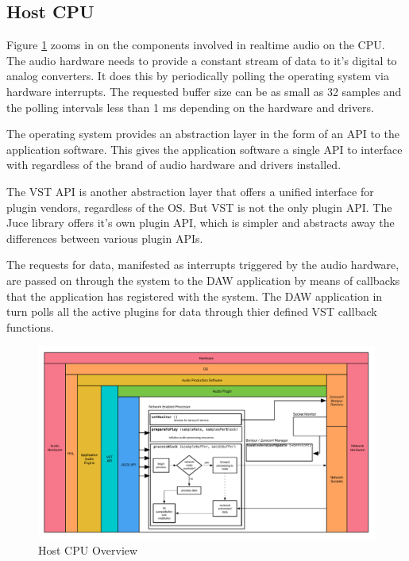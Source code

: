 \subsection{Host CPU}

Figure \ref{fig:arch_02} zooms in on the components involved in realtime audio on the CPU. The audio hardware needs to provide a constant stream of data to it's digital to analog converters. It does this by periodically polling the operating system via hardware interrupts. The requested buffer size can be as small as 32 samples and the polling intervals less than 1 ms depending on the hardware and drivers.

The operating system provides an abstraction layer in the form of an API to the application software. This gives the application software a single API to interface with regardless of the brand of audio hardware and drivers installed.

The VST API is another abstraction layer that offers a unified interface for plugin vendors, regardless of the OS. But VST is not the only plugin API. The Juce library offers it's own plugin API, which is simpler and abstracts away the differences between various plugin APIs.

The requests for data, manifested as interrupts triggered by the audio hardware, are passed on through the system to the DAW application by means of callbacks that the application has registered with the system. The DAW application in turn polls all the active plugins for data through thier defined VST callback functions.

\begin{figure}[H]
    \centering
    \includegraphics[width=\textwidth]{assets/architecture_02.pdf}
    \caption{Host CPU Overview}
    \label{fig:arch_02}
\end{figure}

